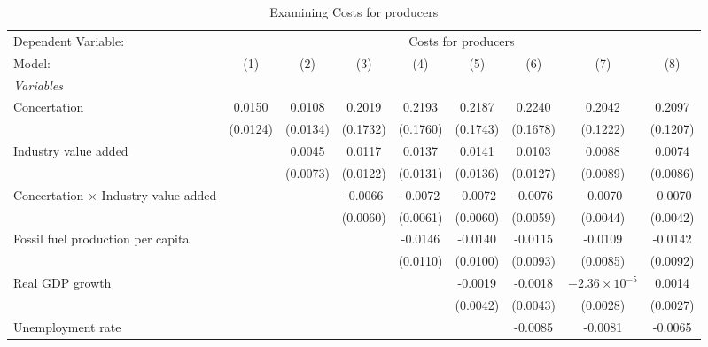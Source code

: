 
\begin{table}[htbp]
   \caption{Examining Costs for producers}
   \centering
   \begin{tabular}{lcccccccc}
      \tabularnewline \midrule \midrule
      Dependent Variable: & \multicolumn{8}{c}{Costs for producers}\\
      Model:                                      & (1)      & (2)      & (3)      & (4)      & (5)      & (6)      & (7)                    & (8)\\  
      \midrule
      \emph{Variables}\\
      Concertation                                & 0.0150   & 0.0108   & 0.2019   & 0.2193   & 0.2187   & 0.2240   & 0.2042                 & 0.2097\\   
                                                  & (0.0124) & (0.0134) & (0.1732) & (0.1760) & (0.1743) & (0.1678) & (0.1222)               & (0.1207)\\   
      Industry value added                        &          & 0.0045   & 0.0117   & 0.0137   & 0.0141   & 0.0103   & 0.0088                 & 0.0074\\   
                                                  &          & (0.0073) & (0.0122) & (0.0131) & (0.0136) & (0.0127) & (0.0089)               & (0.0086)\\   
      Concertation $\times$ Industry value added  &          &          & -0.0066  & -0.0072  & -0.0072  & -0.0076  & -0.0070                & -0.0070\\   
                                                  &          &          & (0.0060) & (0.0061) & (0.0060) & (0.0059) & (0.0044)               & (0.0042)\\   
      Fossil fuel production per capita           &          &          &          & -0.0146  & -0.0140  & -0.0115  & -0.0109                & -0.0142\\   
                                                  &          &          &          & (0.0110) & (0.0100) & (0.0093) & (0.0085)               & (0.0092)\\   
      Real GDP growth                             &          &          &          &          & -0.0019  & -0.0018  & $-2.36\times 10^{-5}$  & 0.0014\\   
                                                  &          &          &          &          & (0.0042) & (0.0043) & (0.0028)               & (0.0027)\\   
      Unemployment rate                           &          &          &          &          &          & -0.0085  & -0.0081                & -0.0065\\   

\end{tabular}
\end{table}
